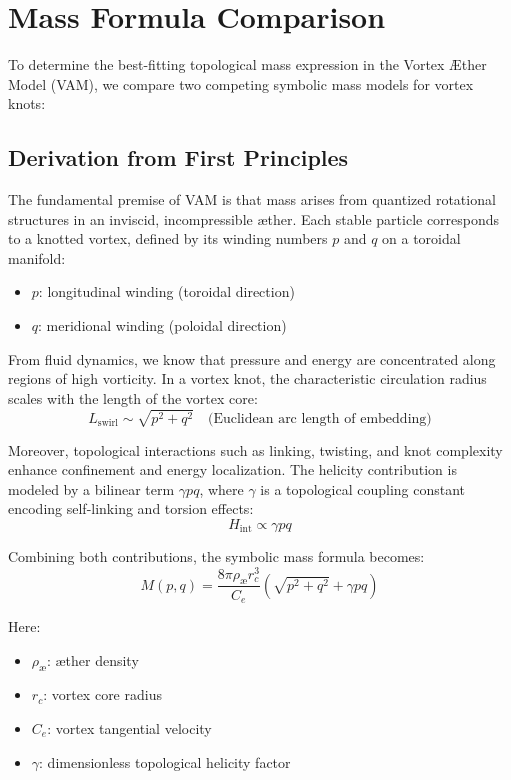 \section{Mass Formula Comparison}
To determine the best-fitting topological mass expression in the Vortex Æther Model (VAM), we compare two competing symbolic mass models for vortex knots:

\subsection{Derivation from First Principles}
The fundamental premise of VAM is that mass arises from quantized rotational structures in an inviscid, incompressible æther. Each stable particle corresponds to a knotted vortex, defined by its winding numbers \(p\) and \(q\) on a toroidal manifold:
\begin{itemize}
    \item \(p\): longitudinal winding (toroidal direction)
    \item \(q\): meridional winding (poloidal direction)
\end{itemize}

From fluid dynamics, we know that pressure and energy are concentrated along regions of high vorticity. In a vortex knot, the characteristic circulation radius scales with the length of the vortex core:
\begin{equation}
    L_{\text{swirl}} \sim \sqrt{p^2 + q^2} \quad \text{(Euclidean arc length of embedding)}
\end{equation}

Moreover, topological interactions such as linking, twisting, and knot complexity enhance confinement and energy localization. The helicity contribution is modeled by a bilinear term \(\gamma p q\), where \(\gamma\) is a topological coupling constant encoding self-linking and torsion effects:
\begin{equation}
    H_{\text{int}} \propto \gamma p q
\end{equation}

Combining both contributions, the symbolic mass formula becomes:
\begin{equation}
    M(p,q) = \frac{8\pi \rho_{\text{\ae}} r_c^3}{C_e} \left( \sqrt{p^2 + q^2} + \gamma p q \right)
\end{equation}

Here:
\begin{itemize}
    \item \(\rho_{\text{\ae}}\): æther density
    \item \(r_c\): vortex core radius
    \item \(C_e\): vortex tangential velocity
    \item \(\gamma\): dimensionless topological helicity factor
\end{itemize}

